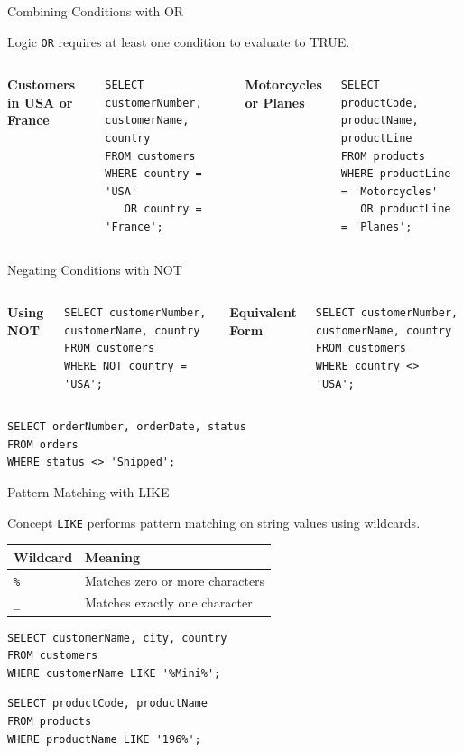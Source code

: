 \documentclass[aspectratio=169,11pt]{beamer}
\newcommand{\kw}[1]{\textcolor{sqlblue}{\texttt{#1}}}
\newcommand{\minihead}[1]{\vspace{2pt}\textbf{#1}\vspace{2pt}}
\begin{document}
\begin{frame}[fragile]{Combining Conditions with OR}
\begin{block}{Logic}
\kw{OR} requires at least one condition to evaluate to TRUE.
\end{block}
\begin{columns}[T]
\minihead{Customers in USA or France}
\begin{lstlisting}
SELECT customerNumber, customerName, country
FROM customers
WHERE country = 'USA'
   OR country = 'France';
\end{lstlisting}
\minihead{Motorcycles or Planes}
\begin{lstlisting}
SELECT productCode, productName, productLine
FROM products
WHERE productLine = 'Motorcycles'
   OR productLine = 'Planes';
\end{lstlisting}
\end{columns}
\end{frame}

\begin{frame}[fragile]{Negating Conditions with NOT}
\begin{columns}[T]
\minihead{Using NOT}
\begin{lstlisting}
SELECT customerNumber, customerName, country
FROM customers
WHERE NOT country = 'USA';
\end{lstlisting}
\minihead{Equivalent Form}
\begin{lstlisting}
SELECT customerNumber, customerName, country
FROM customers
WHERE country <> 'USA';
\end{lstlisting}
\end{columns}
\vspace{5pt}
\begin{lstlisting}
SELECT orderNumber, orderDate, status
FROM orders
WHERE status <> 'Shipped';
\end{lstlisting}
\end{frame}

\begin{frame}[fragile]{Pattern Matching with LIKE}
\begin{block}{Concept}
\kw{LIKE} performs pattern matching on string values using wildcards.
\end{block}
\begin{center}
\begin{tabular}{ll}
\toprule
\textbf{Wildcard} & \textbf{Meaning} \\
\midrule
\texttt{\%} & Matches zero or more characters \\
\texttt{\_} & Matches exactly one character \\
\bottomrule
\end{tabular}
\end{center}
\begin{lstlisting}
SELECT customerName, city, country
FROM customers
WHERE customerName LIKE '%Mini%';
\end{lstlisting}
\begin{lstlisting}
SELECT productCode, productName
FROM products
WHERE productName LIKE '196%';
\end{lstlisting}
\end{frame}
\end{document}
